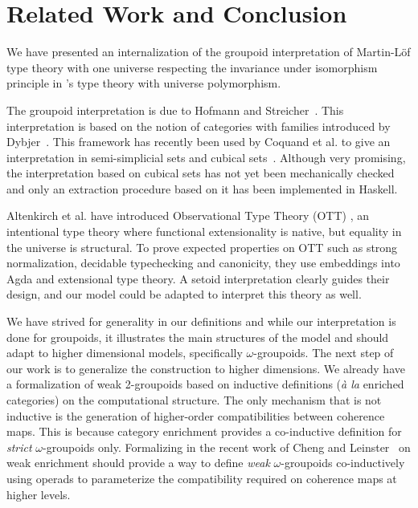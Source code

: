 
\section{Related Work and Conclusion}
\label{sec:conclusion}

We have presented an internalization of the groupoid interpretation of
Martin-Löf type theory with one universe respecting the invariance under
isomorphism principle in \Coq's type theory with universe polymorphism.

The groupoid interpretation is due to Hofmann
and Streicher~\cite{groupoid-interp}. This interpretation is based on
the notion of categories with families introduced by
Dybjer~\cite{dybjer:internaltt}. 
%
This framework has recently been used by Coquand et al. to give an
interpretation in semi-simplicial sets and cubical
sets~\cite{barras:_gener_takeut_gandy_inter,coquand:cubical}.
%
Although very promising, the interpretation based on cubical sets has not
yet been mechanically checked and only an extraction procedure based on
it has been implemented in Haskell.

Altenkirch et al. have introduced Observational Type Theory (OTT)
\cite{altenkirch-mcbride-wierstra:ott-now}, an intentional type theory where
functional extensionality is native, but equality in the universe is structural.
%
To prove expected properties on OTT such as strong normalization,
decidable typechecking and canonicity, they use embeddings into Agda and
extensional type theory. A setoid interpretation clearly guides their
design, and our model could be adapted to interpret this theory as well.

We have strived for generality in our definitions and while our
interpretation is done for groupoids, it illustrates the main structures of the
model and should adapt to higher dimensional models, specifically
$\omega$-groupoids.
%
The next step of our work is to generalize the construction to higher
dimensions. We already have a formalization of weak 2-groupoids based
on inductive definitions (\emph{à la} enriched categories) on the
computational structure.
%
The only mechanism that is not inductive is the generation of
higher-order compatibilities between coherence maps. 
%
This is because category enrichment provides a co-inductive definition
for \emph{strict} $\omega$-groupoids only. Formalizing in \Coq the recent work
of Cheng and Leinster~\cite{cheng2012weak} on weak enrichment should
provide a way to define \emph{weak} $\omega$-groupoids co-inductively using
operads to parameterize the compatibility required on coherence maps at
higher levels.
  

